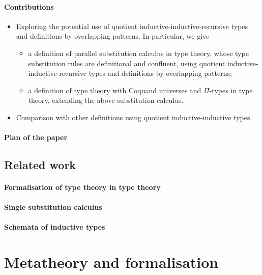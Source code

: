 \documentclass[a4paper,UKenglish,numberwithinsect,cleveref,thm-restate]{lipics-v2021}
\begin{document}
\paragraph*{Contributions}
\begin{itemize}
  \item Exploring the potential use of quotient inductive-inductive-recursive types and definitions by overlapping patterns.
    In particular, we give
    \begin{itemize}
      \item a definition of parallel substitution calculus in type theory, whose type substitution rules are definitional and confluent, using quotient inductive-inductive-recursive types and definitions by overlapping patterns;
      \item a definition of type theory with Coquand universes and $\Pi$-types in type theory, extending the above substitution calculus.
    \end{itemize}
  \item Comparison with other definitions using quotient inductive-inductive types.
\end{itemize}

\paragraph*{Plan of the paper}
\subsection{Related work}
\paragraph*{Formalisation of type theory in type theory}
\cite{Danielsson2006}
\paragraph*{Single substitution calculus}
\cite{Kaposi2023,Kaposi2024a}
\paragraph*{Schemata of inductive types}
\cite{Altenkirch2016a,Kaposi2019}

\section{Metatheory and formalisation}
\cite{Pujet2022,Pujet2024}
\end{document}
